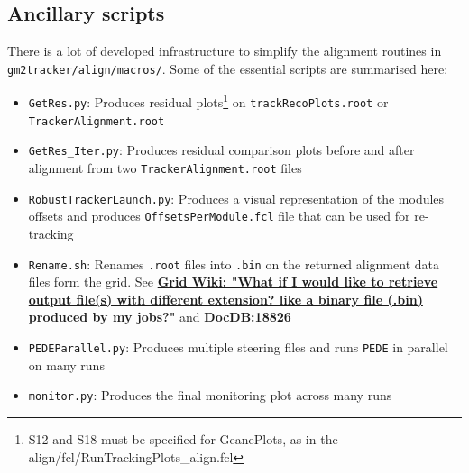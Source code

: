 \documentclass[12pt]{article}
\begin{document}
\subsection{Ancillary scripts}
There is a lot of developed infrastructure to simplify the alignment routines in \\ \verb!gm2tracker/align/macros/!. Some of the essential scripts are summarised here: 
\begin{itemize}\setlength\itemsep{0.05em}\small
    \item \verb!GetRes.py!: Produces residual plots\footnote{S12 and S18 must be specified for GeanePlots, as in the align/fcl/RunTrackingPlots\_align.fcl} on \verb!trackRecoPlots.root! or \verb!TrackerAlignment.root!
    \item \verb!GetRes_Iter.py!: Produces residual comparison plots before and after alignment from two \verb!TrackerAlignment.root! files
    \item \verb!RobustTrackerLaunch.py!: Produces a visual representation of the modules offsets and produces \verb!OffsetsPerModule.fcl! file that can be used for re-tracking  
    \item \verb!Rename.sh!: Renames \verb!.root! files into \verb!.bin! on the returned alignment data files form the grid. See \textbf{\href{https://redmine.fnal.gov/redmine/projects/g-2/wiki/Job_Running_Submission_FAQ\#What-if-I-would-like-to-retrieve-output-files-with-different-extension-like-a-binary-file-bin-produced-by-my-jobs}{Grid Wiki: "What if I would like to retrieve output file(s) with different extension? like a binary file (.bin) produced by my jobs?"}} and \textbf{\href{https://gm2-docdb.fnal.gov/cgi-bin/private/ShowDocument?docid=18826}{DocDB:18826}} 
    \item \verb!PEDEParallel.py!: Produces multiple steering files and runs \texttt{PEDE} in parallel on many runs 
       \item \verb!monitor.py!: Produces the final monitoring plot across many runs 
\end{itemize}
\end{document}
